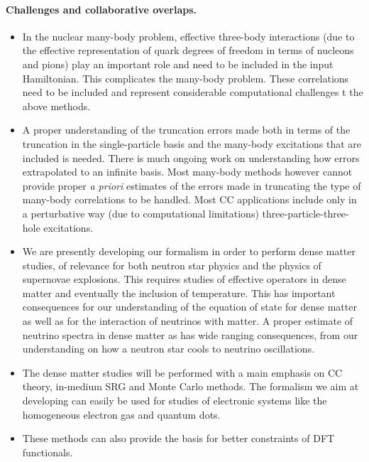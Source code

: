 \documentclass[%
oneside,                 %
final,                   %
10pt]{article}
\begin{document}
\noindent
\paragraph{Challenges and collaborative overlaps.}
\begin{itemize}
\item In the nuclear many-body problem, effective three-body interactions (due to the effective representation of quark degrees of freedom in terms of nucleons and pions) play an important role and need to be included in the input Hamiltonian. This complicates the many-body problem. These correlations need to be included and represent considerable computational challenges t the above methods.

\item A proper understanding  of the truncation errors made both in terms of the truncation in the single-particle basis and the many-body excitations that are included is needed. There is much ongoing work on understanding how errors extrapolated to an infinite basis. Most many-body methods however cannot provide proper \emph{a priori} estimates of the errors made in truncating the type of many-body correlations to be handled. Most CC applications include only in a perturbative way (due to computational limitations) three-particle-three-hole excitations. 

\item We are presently developing our formalism in order to perform dense matter studies, of relevance for both neutron star physics and the physics of supernovae explosions. This requires studies of effective operators in dense matter and eventually the inclusion of temperature. This has important consequences for our understanding of the equation of state for dense matter as well as for the interaction of neutrinos with matter. A proper estimate of neutrino spectra in dense matter as has wide ranging consequences, from our understanding on how a neutron star cools to neutrino oscillations. 

\item The dense matter studies will be performed with a main emphasis on CC theory, in-medium SRG and Monte Carlo methods. The formalism we aim at developing can easily be used for studies of electronic systems like the homogeneous electron gas and quantum dots. 

\item These methods can also provide the basis for better constraints of DFT functionals.
\end{itemize}
\end{document}
